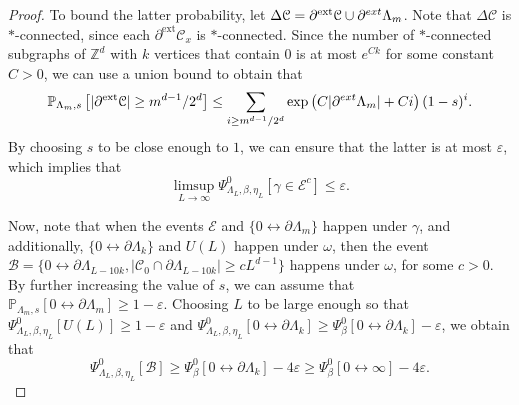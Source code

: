 \documentclass[11pt,a4paper]{article}
\theoremstyle{definition}
\numberwithin{equation}{section}
\begin{document}
\begin{proof}
To bound the latter probability, let $\Delta \mathcal{C}=\partial^{\mathrm{ext}} \mathcal{C} \cup \partial^{\rm ext} \Lambda_m$. Note that $\Delta \mathcal{C}$ is $*$-connected, since each $\partial^{\mathrm{ext}} \mathcal{C}_x$ is $*$-connected. Since the number of $*$-connected subgraphs of $\mathbb{Z}^d$ with $k$ vertices that contain $0$ is at most $e^{Ck}$ for some constant $C>0$, we can use a union bound to obtain that
\begin{equation}
\mathbb{P}_{\Lambda_m,s}\left[|\partial^{\mathrm{ext}} \mathcal{C}|\geq m^{d-1}/2^d\right]\leq \sum_{i\geq m^{d-1}/2^d}\exp\left(C|\partial^{\rm ext} \Lambda_m|+Ci\right) (1-s)^{i}.
\end{equation}
By choosing $s$ to be close enough to $1$, we can ensure that the latter is at most $\varepsilon$, which implies that
\begin{equation}
\limsup_{L\to\infty} \Psi_{\Lambda_L,\beta,\eta_L}^0[\gamma \in \mathcal{E}^c]\leq \varepsilon.
\end{equation}

Now, note that when the events $\mathcal{E}$ and $\{0 \longleftrightarrow \partial \Lambda_{m}\}$ happen under $\gamma$, and additionally, $\{0\longleftrightarrow \partial \Lambda_k\}$ and $U(L)$ happen under $\omega$, then the event $\mathcal{B}=\{0\longleftrightarrow \partial \Lambda_{L-10k}, |\mathcal{C}_0 \cap \partial \Lambda_{L-10k}|\geq  cL^{d-1}\}$ happens under $\omega$, for some $c>0$. By further increasing the value of $s$, we can assume that 
$\mathbb{P}_{\Lambda_m,s}[0 \longleftrightarrow \partial \Lambda_m]\geq 1-\varepsilon$. Choosing $L$ to be large enough so that $\Psi^0_{\Lambda_L,\beta,\eta_L}[U(L)]\geq 1-\varepsilon$ and $\Psi^0_{\Lambda_L,\beta,\eta_L}[0\longleftrightarrow \partial \Lambda_k]\geq \Psi^0_{\beta}[0\longleftrightarrow \partial \Lambda_k]-\varepsilon$, we obtain that
\begin{equation}
\Psi^0_{\Lambda_L,\beta,\eta_L}[\mathcal{B}]\geq \Psi^0_{\beta}[0\longleftrightarrow \partial \Lambda_k]-4\varepsilon\geq \Psi^0_{\beta}[0\longleftrightarrow \infty]-4\varepsilon.     
\end{equation}


\end{proof}
\end{document}
